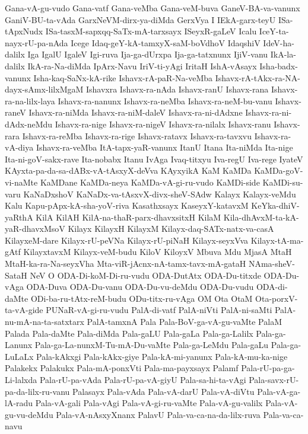 {Gana-vA-gu-vudo
Gana-vatf
Gana-veMba
Gana-veM-buva
GaneV-BA-va-vanunx
GaniV-BU-ta-vAda
GarxNeVM-dirx-ya-diMda
GerxVya
I
IEkA-garx-teyU
ISa-tApxNudx
ISa-tasxM-sapxqq-SaTx-mA-tarxsayx
ISeyxR-gaLeV
Icalu
IceY-ta-nayx-rU-pa-nAda
Icege
Idaq-geY-kA-tamxyX-saM-boVdhoV
IdaqshiV
IdeV-ha-dalilx
Iga
IgalU
IgaleV
Igi-ruva
Ija-ga-dUrxpa
Ija-ga-tatxnunx
IjiV-vanu
IkA-la-dalilx
IkA-ra-Na-diMda
IpArx-Navu
IriV-ti-yAgi
IritaH
IshA-vAsayx
Isha-badx-vanunx
Isha-kaq-SaNx-kA-rike
Ishavx-rA-paR-Na-veMba
Ishavx-rA-tAkx-ra-NA-dayx-sAmx-lilxMgaM
Ishavxra
Ishavx-ra-nAda
Ishavx-ranU
Ishavx-rana
Ishavx-ra-na-lilx-laya
Ishavx-ra-nanunx
Ishavx-ra-neMba
Ishavx-ra-neM-bu-vanu
Ishavx-raneV
Ishavx-ra-niMda
Ishavx-ra-niM-daleV
Ishavx-ra-ni-dAdxne
Ishavx-ra-ni-dAdx-neMdu
Ishavx-ra-nige
Ishavx-ra-nigeV
Ishavx-ra-nilalx
Ishavx-ranu
Ishavx-rara
Ishavx-ra-reMba
Ishavx-ra-rige
Ishavx-ratavx
Ishavx-ra-tavxvu
Ishavx-ra-vA-diya
Ishavx-ra-veMba
ItA-tapx-yaR-vanunx
ItanU
Itana
Ita-niMda
Ita-nige
Ita-ni-goV-sakx-rave
Ita-nobabx
Itanu
IvAga
Ivaq-titxyu
Iva-regU
Iva-rege
IyateV
KAyxta-pa-da-sa-dABx-vA-tAsxyX-deVva
KAyxyikA
KaM
KaMDa
KaMDa-goV-vi-naMte
KaMDane
KaMDa-neya
KaMDa-vA-gi-ru-vudo
KaMDi-side
KaMDi-su-varu
KaNaDxshoV
KaNaDx-va-tAsxvX-divx-sheV-SAdw
Kalayx
Kalayx-veMdu
Kalu
Kapu-pApx-kA-sha-yoV-riva
Kasathxsayx
KaseyxY-katavxM
KeYka-dhiV-yaRthA
KilA
KilAH
KilA-na-thaR-parx-dhavxsitxH
KilaM
Kila-dhAvxM-ta-kA-yaR-dhavxMsoV
Kilayx
KilayxH
KilayxM
Kilayx-daq-SATx-natx-va-casA
KilayxeM-dare
Kilayx-rU-peVNa
Kilayx-rU-piNaH
Kilayx-seyxVva
Kilayx-tA-ma-gAtf
KilayxtavxM
Kilayx-veM-budu
KiloV
KiloyxV
Mbuva
Mdu
MjasA
MtaH
MtaH-ka-ra-Na-seyxVha
Mta-viR-jAcnx-nA-tamx-tavx-mA-gataH
NAma-sheV-SataH
NeV
O
ODA-Di-koM-Di-ru-vudu
ODA-DutAtx
ODA-Du-titxde
ODA-Du-vAga
ODA-Duva
ODA-Du-vanu
ODA-Du-vu-deMdu
ODA-Du-vudu
ODA-di-daMte
ODi-ba-ru-tAtx-reM-budu
ODu-titx-ru-vAga
OM
Ota
OtaM
Ota-porxV-ta-vA-gide
PUNaR-vA-gi-ru-vudu
PalA-di-vatf
PalA-niVti
PalA-ni-saMti
PalA-nu-mA-na-ta-satxtarx
PalA-tamxnA
Pala
Pala-BoV-ga-vA-gu-vaMte
PalaM
Palada
Pala-daMte
Pala-diMda
Pala-gaLU
Pala-gaLa
Pala-ga-Lalilx
Pala-ga-Lanunx
Pala-ga-La-nunxM-Tu-mA-Du-vaMte
Pala-ga-LeMdu
Pala-gaLu
Pala-ga-LuLaLx
Pala-kAkxgi
Pala-kAkx-giye
Pala-kA-mi-yanunx
Pala-kA-mu-ka-nige
Palakekx
Palakukx
Pala-mA-ponxVti
Pala-ma-payxsayx
Palamf
Pala-rU-pa-ga-Li-lalxda
Pala-rU-pa-vAda
Pala-rU-pa-vA-giyU
Pala-sa-hi-ta-vAgi
Pala-savx-rU-pa-da-lilx-ru-vanu
Palasayx
Pala-vAda
Pala-vA-darU
Pala-vA-diVtu
Pala-vA-ga-lA-radu
Pala-vA-gali
Pala-vAgi
Pala-vA-gi-ru-vaMte
Pala-vA-gu-valilx
Pala-vA-gu-vu-deMdu
Pala-vA-nAsxyXnanx
PalavU
Pala-va-ca-na-da-lilx-ruva
Pala-va-ca-navu
}

